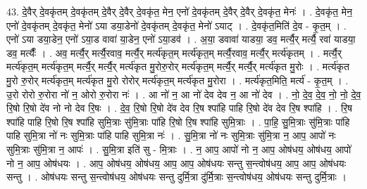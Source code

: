 \documentclass[17pt]{extarticle}
\begin{document}
43. दे॒वैर् दे॒वकृ॑तम् दे॒वकृ॑तम् दे॒वैर् दे॒वैर् दे॒वकृ॑त॒ मेन॒ एनो॑ दे॒वकृ॑तम् दे॒वैर् दे॒वैर् दे॒वकृ॑त॒ मेनः॑ । . दे॒वकृ॑त॒ मेन॒ एनो॑ दे॒वकृ॑तम् दे॒वकृ॑त॒ मेनो॑ ऽया डया॒डेनो॑ दे॒वकृ॑तम् दे॒वकृ॑त॒ मेनो॑ ऽयाट् । . दे॒वकृ॑त॒मिति॑ दे॒व - कृ॒त॒म् । . एनो॑ ऽया डया॒डेन॒ एनो॑ ऽया॒ड वावा॑ या॒डेन॒ एनो॑ ऽया॒डव॑ । . अ॒या॒ डवावा॑ याडया॒ डव॒ मर्त्यै॒र् मर्त्यै॒ रवा॑ याडया॒ डव॒ मर्त्यैः᳚ । . अव॒ मर्त्यै॒र् मर्त्यै॒रवाव॒ मर्त्यै॒र् मर्त्य॑कृत॒म् मर्त्य॑कृत॒म् मर्त्यै॒रवाव॒ मर्त्यै॒र् मर्त्य॑कृतम् । . मर्त्यै॒र् मर्त्य॑कृत॒म् मर्त्य॑कृत॒म् मर्त्यै॒र् मर्त्यै॒र् मर्त्य॑कृत मु॒रोरु॒रोर् मर्त्य॑कृत॒म् मर्त्यै॒र् मर्त्यै॒र् मर्त्य॑कृत मु॒रोः । . मर्त्य॑कृत मु॒रो रु॒रोर् मर्त्य॑कृत॒म् मर्त्य॑कृत मु॒रो रोरोर् मर्त्य॑कृत॒म् मर्त्य॑कृत मु॒रोरा । . मर्त्य॑कृत॒मिति॒ मर्त्य॑ - कृ॒त॒म् । . उ॒रो रोरो रु॒रोरा नो॑ न॒ ओरो रु॒रोरा नः॑ । . आ नो॑ न॒ आ नो॑ देव देव न॒ आ नो॑ देव । . नो॒ दे॒व॒ दे॒व॒ नो॒ नो॒ दे॒व॒ रि॒षो रि॒षो दे॑व नो नो देव रि॒षः । . दे॒व॒ रि॒षो रि॒षो दे॑व देव रि॒ष श्पा॑हि पाहि रि॒षो दे॑व देव रि॒ष श्पा॑हि । . रि॒ष श्पा॑हि पाहि रि॒षो रि॒ष श्पा॑हि सुमि॒त्राः सु॑मि॒त्राः पा॑हि रि॒षो रि॒ष श्पा॑हि सुमि॒त्राः । . पा॒हि॒ सु॒मि॒त्राः सु॑मि॒त्राः पा॑हि पाहि सुमि॒त्रा नो॑ नः सुमि॒त्राः पा॑हि पाहि सुमि॒त्रा नः॑ । . सु॒मि॒त्रा नो॑ नः सुमि॒त्राः सु॑मि॒त्रा न॒ आप॒ आपो॑ नः सुमि॒त्राः सु॑मि॒त्रा न॒ आपः॑ । . सु॒मि॒त्रा इति॑ सु - मि॒त्राः । . न॒ आप॒ आपो॑ नो न॒ आप॒ ओष॑धय॒ ओष॑धय॒ आपो॑ नो न॒ आप॒ ओष॑धयः । . आप॒ ओष॑धय॒ ओष॑धय॒ आप॒ आप॒ ओष॑धयः सन्तु स॒न्त्वोष॑धय॒ आप॒ आप॒ ओष॑धयः सन्तु । . ओष॑धयः सन्तु स॒न्त्वोष॑धय॒ ओष॑धयः सन्तु दुर्मि॒त्रा दु॑र्मि॒त्राः स॒न्त्वोष॑धय॒ ओष॑धयः सन्तु दुर्मि॒त्राः । \newline
\pagebreak
{}
\end{document}
